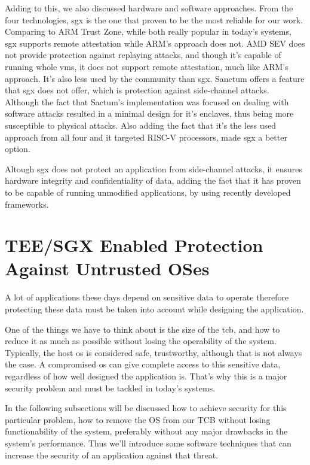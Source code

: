Adding to this, we also discussed hardware and software approaches. 
From the four technologies, \gls{sgx} is the one that proven to be the most reliable for our work. Comparing to ARM Trust Zone, while both really popular in today's systems, \gls{sgx} supports remote attestation while ARM's approach does not. AMD SEV does not provide protection against replaying attacks, and though it's capable of running whole \gls{vm}s, it does not support remote attestation, much like ARM's approach. It's also less used by the community than \gls{sgx}. Sanctum offers a feature that \gls{sgx} does not offer, which is protection against side-channel attacks. Although the fact that Sactum's implementation was focused on dealing with software attacks resulted in a minimal design for it's enclaves, thus being more susceptible to physical attacks. Also adding the fact that it's the less used approach from all four and it targeted RISC-V processors, made \gls{sgx} a better option.

Altough \gls{sgx} does not protect an application from side-channel attacks, it ensures hardware integrity and confidentiality of data, adding the fact that it has proven to be capable of running unmodified applications, by using recently developed frameworks.






\section{TEE/SGX Enabled Protection Against Untrusted OSes} %
\label{sec:tee_enabled_frameworks}

A lot of applications these days depend on sensitive data to operate therefore protecting these data must be taken into account while designing the application. 

One of the things we have to think about is the size of the \gls{tcb}, and how to reduce it as much as possible without losing the operability of the system. Typically, the host \gls{os} is considered safe, trustworthy, although that is not always the case. A compromised \gls{os} can give complete access to this sensitive data, regardless of how well designed the application is. That's why this is a major security problem and must be tackled in today's systems. 

In the following subsections will be discussed how to achieve security for this particular problem, how to remove the OS from our TCB without losing functionability of the system, preferably without any major drawbacks in the system's performance. Thus we'll introduce some software techniques that can increase the security of an application against that threat.

